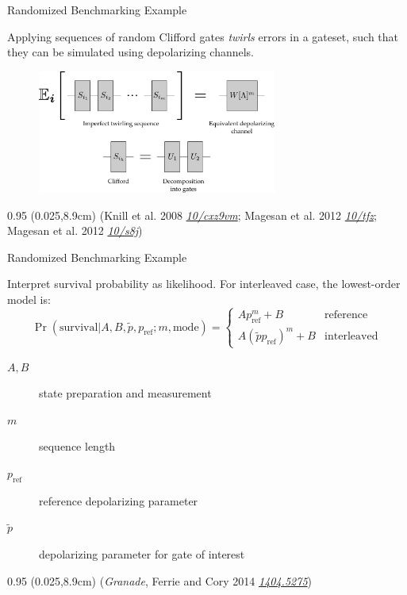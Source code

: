 \documentclass[xcolor=dvipsnames, compress]{beamer}
\renewcommand\UrlFont{\color{red}\rmfamily\itshape}
\newcommand{\shortdoi}[1]{\href{http://doi.org/#1}{\UrlFont 10/#1}}
\newcommand{\arxiv}[1]{\href{https://scirate.com/arxiv/#1}{\UrlFont #1}}
\newcommand{\bottomnote}[1]{
  \begin{textblock*}{0.95\paperwidth} (0.025\paperwidth,8.9cm)
    {\tiny \hfill #1}
  \end{textblock*}
}
\begin{document}
\begin{frame}{Randomized Benchmarking Example}

  Applying sequences of random Clifford gates \emph{twirls}
  errors in a gateset, such that they can be simulated
  using depolarizing channels.

  \begin{figure}
    \centering
    \includegraphics[width=0.7\textwidth]{figures/benchmarking-overview}
  \end{figure}

  \bottomnote{(Knill et al. 2008 \shortdoi{cxz9vm}; Magesan et al. 2012 \shortdoi{tfz}; Magesan et al. 2012 \shortdoi{s8j})}

\end{frame}

\begin{frame}{Randomized Benchmarking Example}

  Interpret survival probability as likelihood.
  For interleaved case, the lowest-order model is:
  \[
    \Pr(\text{survival} | A, B, \tilde{p}, p_{\text{ref}}; m, \text{mode}) =
    \begin{cases}
      A p_{\text{ref}}^m + B & \text{reference} \\
      A (\tilde{p} p_{\text{ref}})^m + B & \text{interleaved}
    \end{cases}
  \]

  \begin{description}
    \item[$A,B$] state preparation and measurement
    \item[$m$] sequence length
    \item[$p_{\text{ref}}$] reference depolarizing parameter
    \item[$\tilde{p}$] depolarizing parameter for gate of interest
  \end{description}

  \bottomnote{(\emph{Granade}, Ferrie and Cory 2014 \arxiv{1404.5275})}

\end{frame}
\end{document}
